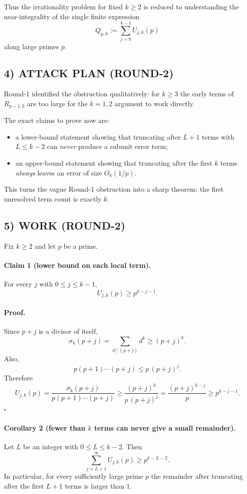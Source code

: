 Thus the irrationality problem for fixed $k\ge 2$ is reduced to understanding the near-integrality of the single finite expression
\[
Q_{p,k}:=\sum_{j=0}^{k-1}U_{j,k}(p)
\]
along large primes $p$.

\subsection*{4) ATTACK PLAN (ROUND-2)}
Round-1 identified the obstruction qualitatively: for $k\ge 3$ the early terms of $R_{p-1,k}$ are too large for the $k=1,2$ argument to work directly.

The exact claims to prove now are:

\begin{itemize}
\item a lower-bound statement showing that truncating after $L+1$ terms with $L\le k-2$ can \emph{never} produce a subunit error term;
\item an upper-bound statement showing that truncating after the first $k$ terms \emph{always} leaves an error of size $O_k(1/p)$.
\end{itemize}

This turns the vague Round-1 obstruction into a sharp theorem: the first unresolved term count is exactly $k$.

\subsection*{5) WORK (ROUND-2)}
Fix $k\ge 2$ and let $p$ be a prime.

\paragraph{Claim 1 (lower bound on each local term).}
For every $j$ with $0\le j\le k-1$,
\[
U_{j,k}(p)\ge p^{k-j-1}.
\]

\paragraph{Proof.}
Since $p+j$ is a divisor of itself,
\[
\sigma_k(p+j)=\sum_{d\mid (p+j)} d^k \ge (p+j)^k.
\]
Also,
\[
p(p+1)\cdots(p+j)\le p\,(p+j)^j.
\]
Therefore
\[
U_{j,k}(p)
=\frac{\sigma_k(p+j)}{p(p+1)\cdots(p+j)}
\ge \frac{(p+j)^k}{p\,(p+j)^j}
=\frac{(p+j)^{k-j}}{p}
\ge p^{k-j-1}.
\]
\hfill$\square$

\medskip

\paragraph{Corollary 2 (fewer than $k$ terms can never give a small remainder).}
Let $L$ be an integer with $0\le L\le k-2$. Then
\[
\sum_{j=L+1}^{\infty}U_{j,k}(p)\ge p^{k-L-2}.
\]
In particular, for every sufficiently large prime $p$ the remainder after truncating after the first $L+1$ terms is larger than $1$.

